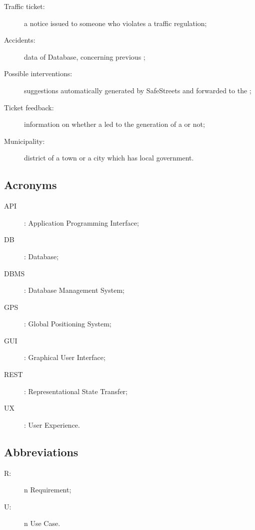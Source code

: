 \documentclass[../../DD.tex]{subfiles}
\begin{document}
\begin{description}
	\item[Traffic ticket:] a notice issued to someone who violates a traffic regulation;
	\item[Accidents:] data of  Database, concerning previous ;
	\item[Possible interventions:] suggestions automatically generated by SafeStreets and forwarded to the ;
	\item[Ticket feedback:] information on whether a  led to the generation of a  or not;
	\item[Municipality:] district of a town or a city which has local government.
\end{description}

\subsection{Acronyms\label{sect:1.3.2}}
\begin{description}
		\item[API]: Application Programming Interface;
		\item[DB]: Database;
		\item[DBMS]: Database Management System;
		\item[GPS]: Global Positioning System;
		\item[GUI]: Graphical User Interface;
		\item[REST]: Representational State Transfer;
		\item[UX]: User Experience.
\end{description}

\subsection{Abbreviations\label{sect:1.3.3}}
\begin{description}
	\item[R:]n Requirement;
	\item[U:]n Use Case.
\end{description}
\end{document}
